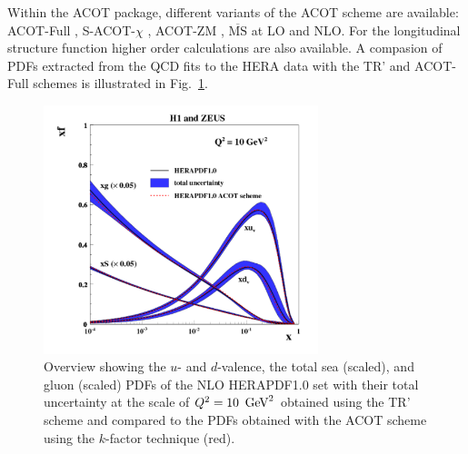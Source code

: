 \begin{description}
\begin{itemize}
%
Within the ACOT package, different variants of the ACOT scheme are available:
ACOT-Full \cite{Aivazis:1993pi}, S-ACOT-$\chi$ \cite{Kramer:2000hn,Kretzer:2003it}, ACOT-ZM \cite{Aivazis:1993pi}, 
$\overline{\text{MS}}$ at LO and NLO. 
For the longitudinal structure function higher order calculations are also available. 
A compasion of PDFs extracted from the QCD fits to the HERA data 
with the TR' and ACOT-Full schemes is illustrated in Fig.~\ref{fig:acotrt}.

\begin{figure}[!ht]
\centering
\includegraphics[width=8cm]{heraacot}
  \caption{Overview showing the $u$- and $d$-valence, the total sea
    (scaled), and gluon (scaled) PDFs of the NLO HERAPDF1.0 set \cite{h1zeus:2009wt} 
    with their 
    total uncertainty at the scale of $Q^2 = 10\ \GeV^2$ obtained 
    using the TR' scheme and compared to the PDFs obtained with 
    the ACOT scheme using the $k$-factor technique (red).}
 \label{fig:acotrt}
\end{figure}


\end{itemize}
\end{description}

